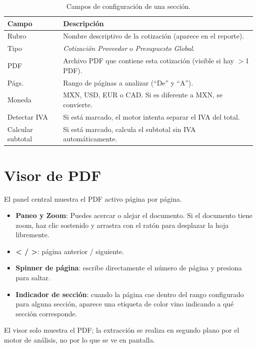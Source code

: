 \documentclass[12pt, a4paper, oneside]{report}
\newcommand{\tecla}[1]{\textsf{\small\fbox{#1}}}
\begin{document}
\begin{table}[H]
  \centering
  \begin{tabularx}{\linewidth}{lX}
    \toprule
    \textbf{Campo} & \textbf{Descripción} \\
    \midrule
    Rubro & Nombre descriptivo de la cotización (aparece en el reporte). \\
    Tipo  & \textit{Cotización Proveedor} o \textit{Presupuesto Global}.\\
    PDF   & Archivo PDF que contiene esta cotización (visible si hay $>$1 PDF). \\
    Págs. & Rango de páginas a analizar (``De'' y ``A''). \\
    Moneda & MXN, USD, EUR o CAD. Si es diferente a MXN, se convierte. \\
    Detectar IVA & Si está marcado, el motor intenta separar el IVA del total. \\
    Calcular subtotal & Si está marcado, calcula el subtotal sin IVA automáticamente. \\
    \bottomrule
  \end{tabularx}
  \caption{Campos de configuración de una sección.}
\end{table}

\section{Visor de PDF}

El panel central muestra el PDF activo página por página.

\begin{itemize}
  \item \textbf{Paneo y Zoom}: Puedes acercar o alejar el documento. Si el documento tiene zoom, haz clic sostenido y arrastra con el ratón para desplazar la hoja libremente.
  \item \textbf{< / >}: página anterior / siguiente.
  \item \textbf{Spinner de página}: escribe directamente el número de página y
        presiona \tecla{Enter} para saltar.
  \item \textbf{Indicador de sección}: cuando la página cae dentro del rango
        configurado para alguna sección, aparece una etiqueta de color vino
        indicando a qué sección corresponde.
\end{itemize}

\begin{notabox}
El visor solo muestra el PDF; la extracción se realiza en segundo plano por el
motor de análisis, no por lo que se ve en pantalla.
\end{notabox}
\end{document}
